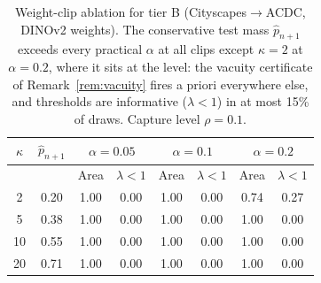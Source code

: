 \begin{table}[t]
\centering
\caption{Weight-clip ablation for tier B (Cityscapes$\to$ACDC, DINOv2 weights). The conservative test mass $\hat{p}_{n+1}$ exceeds every practical $\alpha$ at all clips except $\kappa=2$ at $\alpha=0.2$, where it sits at the level: the vacuity certificate of Remark~\ref{rem:vacuity} fires a priori everywhere else, and thresholds are informative ($\lambda<1$) in at most 15\% of draws. Capture level $\rho=0.1$.}
\label{tab:vacuity}
\footnotesize
\setlength{\tabcolsep}{3pt}
\begin{tabular}{cccccccc}
\toprule
$\kappa$ & $\hat{p}_{n+1}$ & \multicolumn{2}{c}{$\alpha=0.05$} & \multicolumn{2}{c}{$\alpha=0.1$} & \multicolumn{2}{c}{$\alpha=0.2$} \\
\midrule
 & & Area & $\lambda{<}1$ & Area & $\lambda{<}1$ & Area & $\lambda{<}1$ \\
\midrule
2 & 0.20 & 1.00 & 0.00 & 1.00 & 0.00 & 0.74 & 0.27 \\
5 & 0.38 & 1.00 & 0.00 & 1.00 & 0.00 & 1.00 & 0.00 \\
10 & 0.55 & 1.00 & 0.00 & 1.00 & 0.00 & 1.00 & 0.00 \\
20 & 0.71 & 1.00 & 0.00 & 1.00 & 0.00 & 1.00 & 0.00 \\
\bottomrule
\end{tabular}
\end{table}
